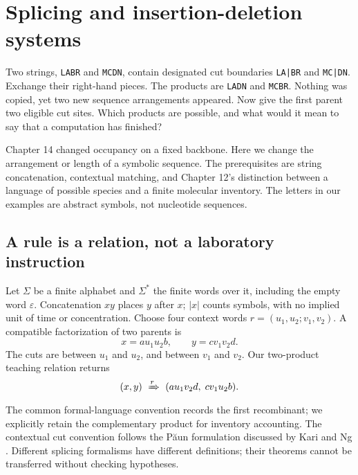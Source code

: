 \chapter{Splicing and insertion-deletion systems}
Two strings, \texttt{LABR} and \texttt{MCDN}, contain designated cut boundaries
\texttt{LA|BR} and \texttt{MC|DN}. Exchange their right-hand pieces.
The products are \texttt{LADN} and \texttt{MCBR}. Nothing was copied, yet
two new sequence arrangements appeared. Now give the first parent two
eligible cut sites. Which products are possible, and what would it mean
to say that a computation has finished?

Chapter 14 changed occupancy on a fixed backbone. Here we change the
arrangement or length of a symbolic sequence. The prerequisites are string
concatenation, contextual matching, and Chapter 12's distinction between
a language of possible species and a finite molecular inventory.
The letters in our examples are abstract symbols, not nucleotide sequences.

\section{A rule is a relation, not a laboratory instruction}
Let $\Sigma$ be a finite alphabet and $\Sigma^*$ the finite words over it,
including the empty word $\varepsilon$. Concatenation $xy$ places $y$ after
$x$; $|x|$ counts symbols, with no implied unit of time or concentration.
Choose four context words $r=(u_1,u_2;v_1,v_2)$.
A compatible factorization of two parents is
\[
 x=a u_1u_2 b,\qquad y=c v_1v_2 d.
\]
The cuts are between $u_1$ and $u_2$, and between $v_1$ and $v_2$.
Our two-product teaching relation returns
\begin{equation}
 (x,y)\ \xRightarrow{r}\ (a u_1v_2d,\;c v_1u_2b).
 \label{eq:splice}
\end{equation}
The common formal-language convention records the first recombinant;
we explicitly retain the complementary product for inventory accounting.
The contextual cut convention follows the P\u{a}un formulation discussed
by Kari and Ng \cite{splicing}. Different splicing formalisms have different
definitions; their theorems cannot be transferred without checking hypotheses.


